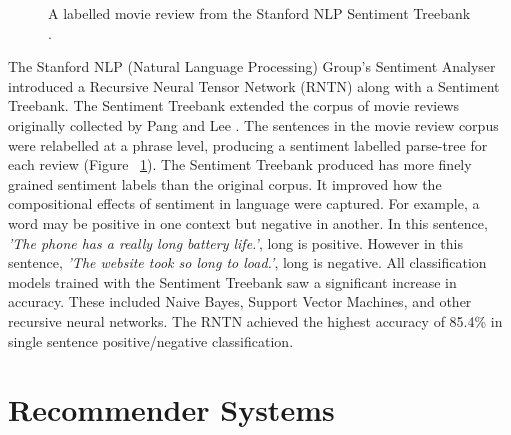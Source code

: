 \begin{figure}[h!]
\centering
{}
\caption{\label{fig:treebank} A labelled movie review from the Stanford NLP Sentiment Treebank \cite{stanfordSentiment2013}.}
\end{figure}

The Stanford NLP (Natural Language Processing) Group's Sentiment Analyser \cite{stanfordSentiment2013} introduced a Recursive Neural Tensor Network (RNTN) along with a Sentiment Treebank. The Sentiment Treebank extended the corpus of movie reviews originally collected by Pang and Lee \cite{panglee2004}. The sentences in the movie review corpus were relabelled at a phrase level, producing a sentiment labelled parse-tree for each review (Figure ~\ref{fig:treebank}). The Sentiment Treebank produced has more finely grained sentiment labels than the original corpus. It improved how the compositional effects of sentiment in language were captured. For example, a word may be positive in one context but negative in another. In this sentence, \emph{'The phone has a really long battery life.'}, long is positive. However in this sentence, \emph{'The website took so long to load.'}, long is negative. All classification models trained with the Sentiment Treebank saw a significant increase in accuracy. These included Naive Bayes, Support Vector Machines, and other recursive neural networks. The RNTN achieved the highest accuracy of 85.4\% in single sentence positive/negative classification.

\section{Recommender Systems}


